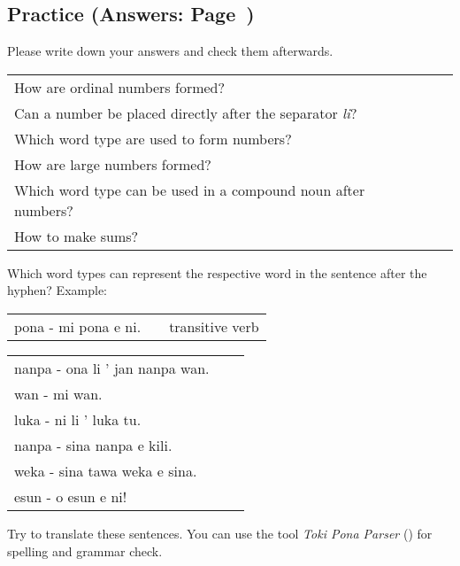 \newpage

\subsection*{Practice (Answers: Page~\pageref{'numbers'})}
Please write down your answers and check them afterwards.

\begin{supertabular}{p{5,5cm}|ll}
    How are ordinal numbers formed?                                  &  & \\
    Can a number be placed directly after the separator \textit{li}? &  & \\
    Which word type are used to form numbers?                        &  & \\
    How are large numbers formed?                                    &  & \\
    Which word type can be used in a compound noun after numbers?    &  & \\
    How to make sums?                                                &  & \\
\end{supertabular}

Which word types can represent the respective word in the sentence after the hyphen?
Example:

\begin{supertabular}{p{5,5cm}|ll}
    pona - mi pona e ni. &  & transitive verb \\
\end{supertabular}

\begin{supertabular}{p{5,5cm}|ll}
    nanpa - ona li ' jan nanpa wan. &  & \\
    wan - mi wan.                   &  & \\
    luka - ni li ' luka tu.         &  & \\
    nanpa - sina nanpa e kili.      &  & \\
    weka - sina tawa weka e sina.   &  & \\
    esun - o esun e ni!             &  & \\
\end{supertabular}

Try to translate these sentences.
You can use the tool \textit{Toki Pona Parser} (\cite{www:rowa:02}) for spelling and grammar check.

